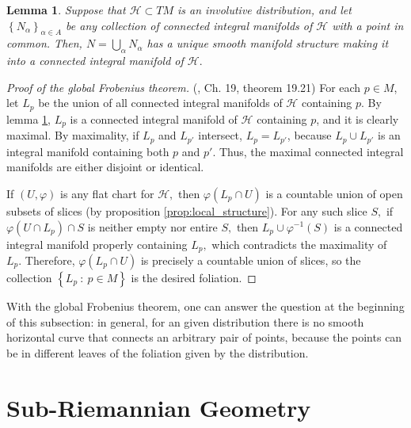 \documentclass[12pt, letterpaper, reqno]{amsart}
\theoremstyle{definition}
\theoremstyle{plain}
\newtheorem{lm}{Lemma}
\theoremstyle{remark}
\begin{document}
\begin{lm}\label{lm:man_struct}
	Suppose that $ \mathcal{H}\subset TM $ is an involutive distribution, and let $ \left\{ N_\alpha \right\}_{\alpha\in A} $ be any collection of connected integral manifolds of $ \mathcal{H} $ with a point in common. Then, $ N=\bigcup_{\alpha} N_\alpha $ has a unique smooth manifold structure making it into a connected integral manifold of $ \mathcal{H}. $  
\end{lm}

\begin{proof}[Proof of the global Frobenius theorem]
	(\cite{lee2003introduction}, Ch. 19, theorem 19.21) For each $ p\in M $, let $ L_p $ be the union of all connected integral manifolds of $ \mathcal{H} $ containing $ p. $ By lemma \ref{lm:man_struct}, $ L_p $ is a connected integral manifold of $ \mathcal{H} $ containing $ p $, and it is clearly maximal. By maximality, if $ L_p $ and $ L_{p'} $ intersect, $ L_p=L_{p'} $, because $ L_p\cup L_{p'} $ is an integral manifold containing both $ p $ and $ p' $. Thus, the maximal connected integral manifolds are either disjoint or identical.    

	If $ (U,\varphi) $ is any flat chart for $ \mathcal{H}, $ then $ \varphi(L_p\cap U) $ is a countable union of open subsets of slices (by proposition \ref{prop:local_structure}). For any such slice $ S, $ if $ \varphi(U\cap L_p)\cap S $ is neither empty nor entire $ S, $ then $ L_p\cup \varphi^{-1}(S )$ is a connected integral manifold properly containing $ L_p, $ which contradicts the maximality of $ L_p. $ Therefore, $ \varphi(L_p\cap U) $ is precisely a countable union of slices, so the collection $ \left\{ L_p\ : \ p\in M \right\} $ is the desired foliation.
\end{proof}

With the global Frobenius theorem, one can answer the question at the beginning of this subsection: in general, for an given distribution there is no smooth horizontal curve that connects an arbitrary pair of points, because the points can be in different leaves of the foliation given by the distribution.


\section{Sub-Riemannian Geometry}%
\label{sec:sub-Riemannian_geometry}
\end{document}
